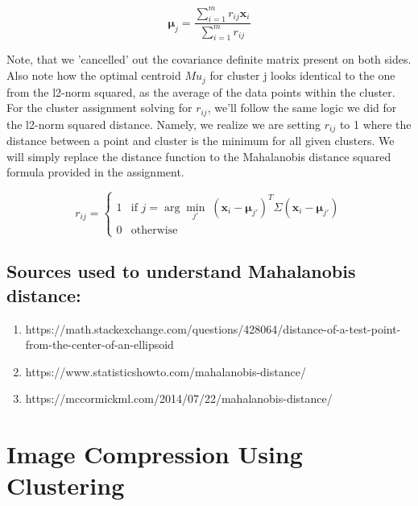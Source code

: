 \documentclass{article}
\begin{document}
\begin{enumerate}
\begin{equation}
\boldsymbol{\mu}_j = \frac{\sum_{i=1}^{m} r_{ij} \mathbf{x}_i}{\sum_{i=1}^{m} r_{ij}}
\end{equation}

Note, that we 'cancelled' out the covariance definite matrix present on both sides. Also note how the
optimal centroid $Mu_j$ for cluster j looks identical to the one from the l2-norm squared, as the average
of the data points within the cluster. For the cluster assignment solving for $r_{ij}$, we'll follow the same
logic we did for the l2-norm squared distance. Namely, we realize we are setting $r_{ij}$ to 1 where
the distance between a point and cluster is the minimum for all given clusters. We will simply replace
the distance function to the Mahalanobis distance squared formula provided in the assignment.

\begin{equation}
r_{ij} = \begin{cases}
1 & \text{if } j = \arg \min_{j'} \; (\mathbf{x}_i - \boldsymbol{\mu}_{j'})^T \Sigma (\mathbf{x}_i - \boldsymbol{\mu}_{j'}) \\
0 & \text{otherwise}
\end{cases}
\end{equation}


\subsection*{Sources used to understand Mahalanobis distance:}
\begin{enumerate}
\item https://math.stackexchange.com/questions/428064/distance-of-a-test-point-from-the-center-of-an-ellipsoid
\item https://www.statisticshowto.com/mahalanobis-distance/
\item https://mccormickml.com/2014/07/22/mahalanobis-distance/
\end{enumerate}
\end{enumerate}

\section{Image Compression Using Clustering}
\end{document}
